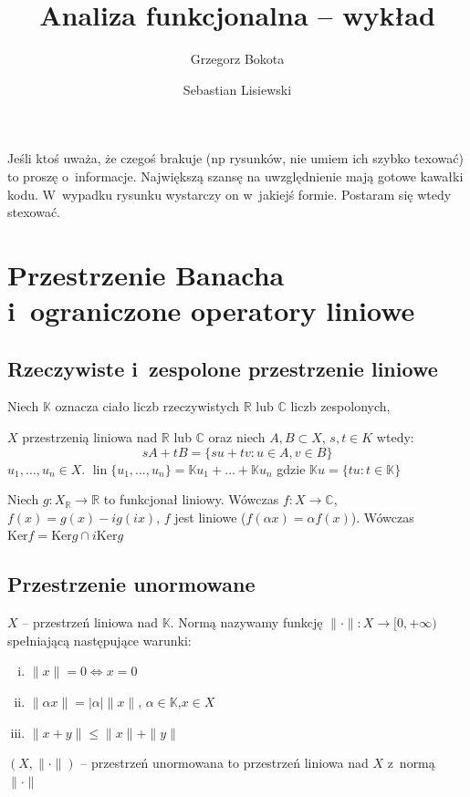 \documentclass[11pt]{mwrep}
\title{Analiza funkcjonalna  -- wykład}
\author{Grzegorz Bokota \and \normalsize  Sebastian Lisiewski}
\renewcommand{\[}{\begin{equation}}
\renewcommand{\]}{\end{equation}}
\newcommand{\C}{{\ensuremath{\mathbb C}}}
\newcommand{\R}{{\ensuremath{\mathbb R}}}
\newcommand{\K}{\ensuremath{\mathbb{K}}}
\newcommand{\lin}{\operatorname{lin}}
\newcounter{numer}
\begin{document}
\setlength{\headheight}{15pt}
\pagestyle{fancy}
\maketitle
\tableofcontents
{}
Jeśli ktoś uważa, że czegoś brakuje (np rysunków, nie umiem ich szybko texować) to proszę o~informacje. 
Największą szansę na uwzględnienie mają gotowe kawałki kodu. W~wypadku rysunku wystarczy on w~jakiejś formie. Postaram się wtedy stexować.
\chapter{Przestrzenie Banacha i~ograniczone operatory liniowe}
\section{Rzeczywiste i~zespolone przestrzenie liniowe}
Niech $\K$ oznacza ciało liczb rzeczywistych $\R$ lub $\C$ liczb zespolonych,\par
$X$ przestrzenią liniowa nad $\R$ lub $\C$ oraz niech $A,B \subset  X$, $s,t \in K$ wtedy:
$$sA+tB = \{su + tv: u \in A, v\in B\}$$
$u_1,\ldots ,u_n \in X $. $\lin\{u_1,\ldots, u_n\} = \K u_1 + \ldots + \K u_n $ gdzie $\K u = \{ t u: t \in \K\} $ 

Niech $g: X_\R \to \R $ to funkcjonał liniowy. Wówczas $f: X \to \C$, $f(x) =g(x) - ig(ix)$, $f$ jest liniowe ($f(\alpha x) = \alpha f(x)$). 
Wówczas $\textrm{Ker}f = \textrm{Ker} g \cap i \textrm{Ker}g$

\section{Przestrzenie unormowane}
$X$ -- przestrzeń liniowa nad $\K$. Normą nazywamy funkcję  $\|\cdot \| : X \to [0, +\infty )$ spełniającą następujące warunki:
	\begin{enumerate}[i.]
	\item $\|x\| = 0 \Leftrightarrow x=0$ 
	\item $\|\alpha x \| = |\alpha| \| x\|$, $\alpha \in \K$,$x\in X$ 
	\item $\|x+y\| \le \|x\| + \|y\|$  
\end{enumerate}
$(X,\|\cdot\|)$ -- przestrzeń unormowana to przestrzeń liniowa nad $X$ z~normą $\|\cdot\|$\\
\end{document}
